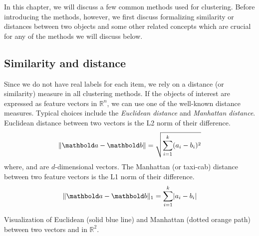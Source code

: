 In this chapter,
we will discuss a few common methods used for clustering.
Before introducing the methods, however,
we first discuss formalizing similarity or distances
between two objects
and some other related concepts
which are crucial for any of the methods we will discuss below.

\subsection{Similarity and distance}

Since we do not have real labels for each item,
we rely on a distance (or similarity) measure in all clustering methods.
If the objects of interest are expressed
as feature vectors in $\mathbb{R}^{n}$,
we can use one of the well-known distance measures.
Typical choices include the \emph{Euclidean distance}
and \emph{Manhattan distance}.
Euclidean distance between two vectors
is the L2 norm of their difference.
  \[\norm{\vect{a} - \vect{b}} =
    \sqrt{\sum_{i=1}^{k} (a_{i} - b_{i})^{2}}
  \]
where,  and  are $d$-dimensional vectors.
The Manhattan (or taxi-cab) distance between two feature vectors is
the L1 norm of their difference.
  \[\norm{\vect{a} - \vect{b}}_{1} =
    \sum_{i=1}^{k} \lvert{}a_{i} - b_{i}\rvert
  \]
\begin{marginfigure}
  \begin{center}
  \end{center}
  \caption{Visualization of Euclidean (solid blue line)
    and Manhattan (dotted orange path) between two vectors
     and  in $\mathbb{R}^2$.
  }
\end{marginfigure}

